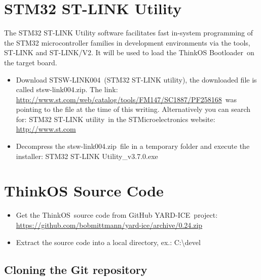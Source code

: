\hypertarget{h.4d34og8}{\section{\texorpdfstring{{STM32 ST-LINK
Utility}}{STM32 ST-LINK Utility}}\label{h.4d34og8}}

{The STM32 ST-LINK Utility software facilitates fast in-system
programming of the STM32 microcontroller families in development
environments via the tools, ST-LINK and ST-LINK/V2. It will be used to
load the }{ThinkOS Bootloader}{~on the target board.}

\begin{itemize}
\tightlist
\item
  {Download }{STSW-LINK004}{~(STM32 ST-LINK utility), the downloaded
  file is called }{stsw-link004.zip}{. The link:
  }{\href{https://www.google.com/url?q=http://www.st.com/web/catalog/tools/FM147/SC1887/PF258168\&sa=D\&ust=1511275046378000\&usg=AFQjCNG92HuOtBhSNJxbtqHYuxedmOi_CA}{http://www.st.com/web/catalog/tools/FM147/SC1887/PF258168}}{~was
  pointing to the file at the time of this writing. Alternatively you
  can search for: }{STM32 ST-LINK utility}{~in the STMicroelectronics
  website:
  }{\href{https://www.google.com/url?q=http://www.st.com\&sa=D\&ust=1511275046378000\&usg=AFQjCNFcwsIyrxx1y2iQSZFPc5tU-A4JIQ}{http://www.st.com}}
\item
  {Decompress the }{stsw-link004.zip}{~file in a temporary folder and
  execute the installer: }{STM32 ST-LINK Utility\_v3.7.0.exe}
\end{itemize}

\hypertarget{h.2s8eyo1}{\section{\texorpdfstring{{ThinkOS Source
Code}}{ThinkOS Source Code}}\label{h.2s8eyo1}}

\begin{itemize}
\tightlist
\item
  {Get the }{ThinkOS}{~source code from GitHub }{YARD-ICE}{~project:
  }{\href{https://www.google.com/url?q=https://github.com/bobmittmann/yard-ice/archive/0.24.zip\&sa=D\&ust=1511275046379000\&usg=AFQjCNH4WK30jeFdsIOws19RGCXF5Ekb5Q}{https://github.com/bobmittmann/yard-ice/archive/0.24.zip}}
\item
  {Extract the source code into a local directory, ex.:
  }{C:\textbackslash{}devel}
\end{itemize}

\subsection{\texorpdfstring{{Cloning the Git
repository}}{Cloning the Git repository}}\label{cloning-the-git-repository}

